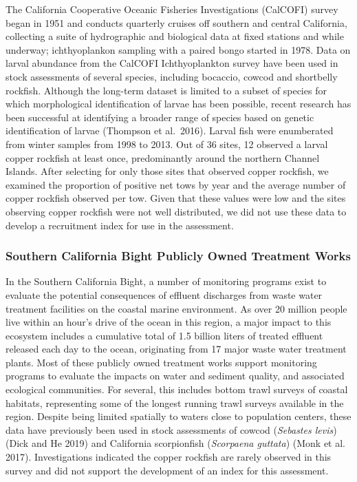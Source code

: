 \documentclass[11pt,
  english,
  letterpaper,
]{article}
\begin{document}
The California Cooperative Oceanic Fisheries Investigations (CalCOFI) survey began in 1951 and conducts quarterly cruises off southern and central California, collecting a suite of hydrographic and biological data at fixed stations and while underway; ichthyoplankon sampling with a paired bongo started in 1978. Data on larval abundance from the CalCOFI Ichthyoplankton survey have been used in stock assessments of several species, including bocaccio, cowcod and shortbelly rockfish. Although the long-term dataset is limited to a subset of species for which morphological identification of larvae has been possible, recent research has been successful at identifying a broader range of species based on genetic identification of larvae (Thompson et al.~2016). Larval fish were enumberated from winter samples from 1998 to 2013. Out of 36 sites, 12 observed a larval copper rockfish at least once, predominantly around the northern Channel Islands. After selecting for only those sites that observed copper rockfish, we examined the proportion of positive net tows by year and the average number of copper rockfish observed per tow. Given that these values were low and the sites observing copper rockfish were not well distributed, we did not use these data to develop a recruitment index for use in the assessment.

\hypertarget{southern-california-bight-publicly-owned-treatment-works}{%
\subsubsection{Southern California Bight Publicly Owned Treatment Works}\label{southern-california-bight-publicly-owned-treatment-works}}

In the Southern California Bight, a number of monitoring programs exist to evaluate the potential consequences of effluent discharges from waste water treatment facilities on the coastal marine environment. As over 20 million people live within an hour's drive of the ocean in this region, a major impact to this ecosystem includes a cumulative total of 1.5 billion liters of treated effluent released each day to the ocean, originating from 17 major waste water treatment plants. Most of these publicly owned treatment works support monitoring programs to evaluate the impacts on water and sediment quality, and associated ecological communities. For several, this includes bottom trawl surveys of coastal habitats, representing some of the longest running trawl surveys available in the region. Despite being limited spatially to waters close to population centers, these data have previously been used in stock assessments of cowcod (\emph{Sebastes levis}) (Dick and He 2019) and California scorpionfish (\emph{Scorpaena guttata}) (Monk et al. 2017). Investigations indicated the copper rockfish are rarely observed in this survey and did not support the development of an index for this assessment.
\end{document}
